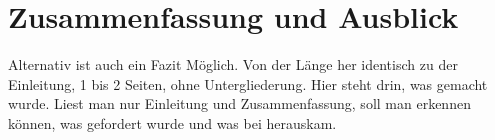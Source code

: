 \section{Zusammenfassung und Ausblick}
\label{Hauptkapitel:Zusammenfassung und Ausblick}

Alternativ ist auch ein Fazit Möglich. Von der Länge her identisch zu der Einleitung, 1 bis 2 Seiten, ohne Untergliederung. Hier steht drin, was gemacht wurde. Liest man nur Einleitung und Zusammenfassung, soll man erkennen können, was gefordert wurde und was bei herauskam.

\clearpage
